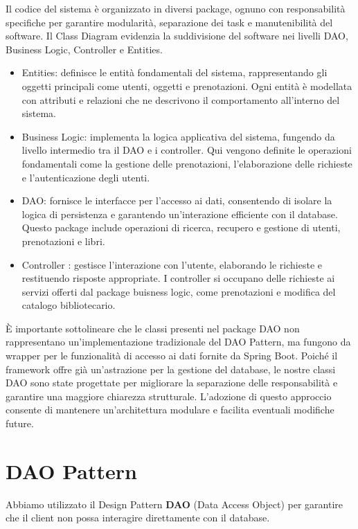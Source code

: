 \documentclass[twoside,openright,titlepage,fleqn,headinclude,12pt,a4paper,BCOR=5mm,footinclude]{scrbook}
\begin{document}
Il codice del sistema è organizzato in diversi package, ognuno con responsabilità specifiche per garantire modularità, separazione dei task e manutenibilità del software. Il Class Diagram evidenzia la suddivisione del software nei livelli DAO, Business Logic, Controller e Entities.
\begin{itemize}
    \item Entities: definisce le entità fondamentali del sistema, rappresentando gli oggetti principali come utenti, oggetti e prenotazioni. Ogni entità è modellata con attributi e relazioni che ne descrivono il comportamento all'interno del sistema.
    \item Business Logic: implementa la logica applicativa del sistema, fungendo da livello intermedio tra il DAO e i controller. Qui vengono definite le operazioni fondamentali come la gestione delle prenotazioni, l’elaborazione delle richieste e l’autenticazione degli utenti.
    \item DAO: fornisce le interfacce per l’accesso ai dati, consentendo di isolare la logica di persistenza e garantendo un’interazione efficiente con il database. Questo package include operazioni di ricerca, recupero e gestione di utenti, prenotazioni e libri.
    \item Controller : gestisce l’interazione con l’utente, elaborando le richieste e restituendo risposte appropriate. I controller si occupano delle richieste ai servizi offerti dal package buisness logic, come prenotazioni e modifica del catalogo bibliotecario.
   
\end{itemize} 
È importante sottolineare che le classi presenti nel package DAO non rappresentano un’implementazione tradizionale del DAO Pattern, ma fungono da wrapper per le funzionalità di accesso ai dati fornite da Spring Boot. Poiché il framework offre già un'astrazione per la gestione del database, le nostre classi DAO sono state progettate per migliorare la separazione delle responsabilità e garantire una maggiore chiarezza strutturale. L’adozione di questo approccio consente di mantenere un'architettura modulare e facilita eventuali modifiche future.




\section{DAO Pattern}

Abbiamo utilizzato il Design Pattern \textbf{DAO} (Data Access Object) per garantire che il client non possa interagire direttamente con il database.
\end{document}
